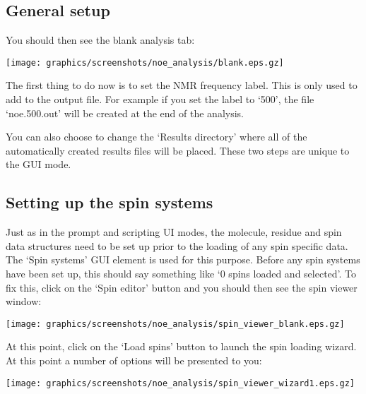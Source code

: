 
\subsection{General setup}

You should then see the blank analysis tab:

\begin{minipage}[h]{\linewidth}
\centerline{\texttt{[image: graphics/screenshots/noe\_analysis/blank.eps.gz]}}
\end{minipage}

The first thing to do now is to set the NMR frequency label.  This is only used to add to the output file.  For example if you set the label to `500', the file `noe.500.out' will be created at the end of the analysis.

You can also choose to change the `Results directory' where all of the automatically created results files will be placed.  These two steps are unique to the GUI mode.



\subsection{Setting up the spin systems}

Just as in the prompt and scripting UI modes, the molecule, residue and spin data structures need to be set up prior to the loading of any spin specific data.  The `Spin systems' GUI element is used for this purpose.  Before any spin systems have been set up, this should say something like `0 spins loaded and selected'.  To fix this, click on the `Spin editor' button and you should then see the spin viewer window:

\begin{minipage}[h]{\linewidth}
\centerline{\texttt{[image: graphics/screenshots/noe\_analysis/spin\_viewer\_blank.eps.gz]}}
\end{minipage}

At this point, click on the `Load spins' button to launch the spin loading wizard.  At this point a number of options will be presented to you: 

\begin{minipage}[h]{\linewidth}
\centerline{\texttt{[image: graphics/screenshots/noe\_analysis/spin\_viewer\_wizard1.eps.gz]}}
\end{minipage}

